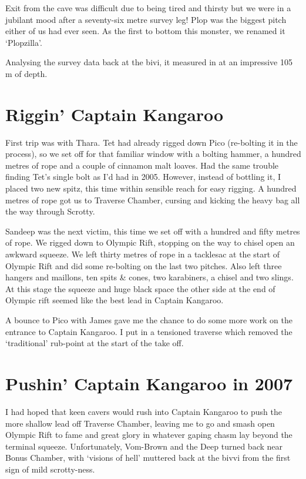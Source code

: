 Exit from the cave was difficult due to being tired and thirsty but we
were in a jubilant mood after a seventy-six metre survey leg! Plop was
the biggest pitch either of us had ever seen. As the first to bottom
this monster, we renamed it `Plopzilla'.

Analysing the survey data back at the bivi, it measured in at an
impressive 105 m of depth.


\hypertarget{riggin-captain-kangaroo}{%
\section{Riggin' Captain Kangaroo}\label{riggin-captain-kangaroo}}

First trip was with Thara. Tet had already rigged down Pico (re-bolting
it in the process), so we set off for that familiar window with a
bolting hammer, a hundred metres of rope and a couple of cinnamon malt
loaves. Had the same trouble finding Tet's single bolt as I'd had in
2005. However, instead of bottling it, I placed two new spitz, this time
within sensible reach for easy rigging. A hundred metres of rope got us
to Traverse Chamber, cursing and kicking the heavy bag all the way
through Scrotty.

Sandeep was the next victim, this time we set off with a hundred and
fifty metres of rope. We rigged down to Olympic Rift, stopping on the
way to chisel open an awkward squeeze. We left thirty metres of rope in
a tacklesac at the start of Olympic Rift and did some re-bolting on the
last two pitches. Also left three hangers and maillons, ten spits \&
cones, two karabiners, a chisel and two slings. At this stage the
squeeze and huge black space the other side at the end of Olympic rift
seemed like the best lead in Captain Kangaroo.

A bounce to Pico with James gave me the chance to do some more work on
the entrance to Captain Kangaroo. I put in a tensioned traverse which
removed the `traditional' rub-point at the start of the take off.


\hypertarget{pushin-captain-kangaroo-in-2007}{%
\section{Pushin' Captain Kangaroo in
2007}\label{pushin-captain-kangaroo-in-2007}}

I had hoped that keen cavers would rush into Captain Kangaroo to push
the more shallow lead off Traverse Chamber, leaving me to go and smash
open Olympic Rift to fame and great glory in whatever gaping chasm lay
beyond the terminal squeeze. Unfortunately, Vom-Brown and the Deep
turned back near Bonus Chamber, with `visions of hell' muttered back at
the bivvi from the first sign of mild scrotty-ness.

